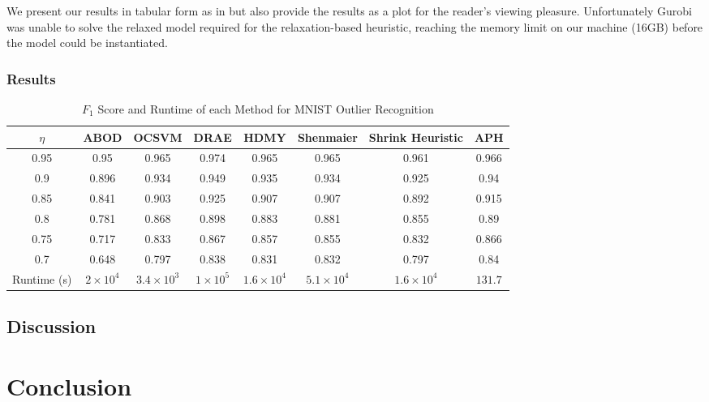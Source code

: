 \documentclass[11pt,twoside]{report}
\theoremstyle{definition}
\numberwithin{theorem}{section}
\numberwithin{definition}{section}
\numberwithin{lemma}{section}
\numberwithin{proposition}{section}
\numberwithin{equation}{section}
\numberwithin{figure}{section}
\begin{document}
We present our results in tabular form as in \cite{huding} but also provide the results as a plot for the reader's viewing pleasure. Unfortunately Gurobi was unable to solve the relaxed model required for the relaxation-based heuristic, reaching the memory limit on our machine (16GB) before the model could be instantiated.

\subsection{Results}

\begin{table}[ht]
    \centering
    \begin{tabular}{|c|c|c|c|c|c|c|c|} \hline
        $\eta$&ABOD&OCSVM&DRAE&HDMY&Shenmaier&Shrink Heuristic&APH \\ \hline
        0.95&0.95&0.965&0.974&0.965&0.965&0.961&0.966 \\
        0.9&0.896&0.934&0.949&0.935&0.934&0.925&0.94 \\
        0.85&0.841&0.903&0.925&0.907&0.907&0.892&0.915 \\
        0.8&0.781&0.868&0.898&0.883&0.881&0.855&0.89 \\
        0.75&0.717&0.833&0.867&0.857&0.855&0.832&0.866 \\
        0.7&0.648&0.797&0.838&0.831&0.832&0.797&0.84 \\ \hline
        Runtime (s) & $2\times10^4$ & $3.4\times10^3$ & $1\times10^5$ & $1.6\times10^4$ & $5.1\times10^4$ & $1.6\times10^4$ & $131.7$ \\[4pt] \hline
    \end{tabular}
    \caption{$F_1$ Score and Runtime of each Method for MNIST Outlier Recognition}
    \label{tab:mnist_table}
\end{table}

\section{Discussion}

\chapter{Conclusion}


\clearpage
\end{document}

